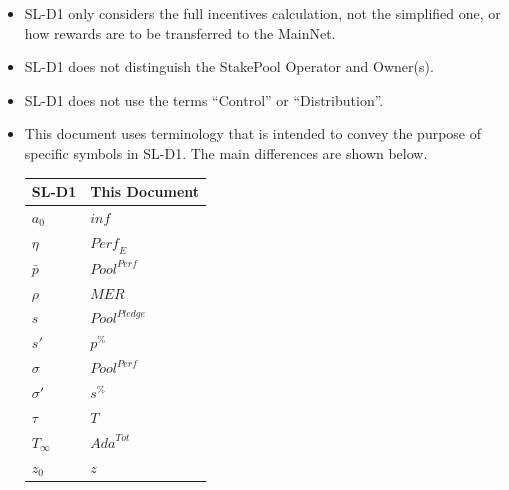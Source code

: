 \documentclass[11pt,a4paper,dvipsnames,twosided,final]{article}
\begin{document}
\begin{itemize}
\item
  SL-D1 only considers the full incentives calculation, not the simplified one, or how
  rewards are to be transferred to the MainNet.
\item
  SL-D1 does not distinguish the StakePool Operator and Owner(s).
\item
  SL-D1 does not use the terms ``Control'' or ``Distribution''.
\item
  This document uses terminology that is intended to convey the purpose of specific symbols
  in SL-D1.  The main differences are shown below.

  \begin{center}
  \begin{tabular}{||l|l||}\hline\hline
    \textbf{SL-D1} & \textbf{This Document} \\ \hline
  $a_0$ & $\textit{inf}$ \\ \hline
  $\eta$ & $\textit{Perf}_E$ \\ \hline
  $\bar{p}$  & $\textit{Pool}^{\textit{Perf}}$ \\ \hline
  $\rho$ & $\textit{MER}$ \\ \hline
  $s$  & $\textit{Pool}^{\textit{Pledge}}$ \\ \hline
  $s'$  & $\textit{p}^{\%}$ \\ \hline
  $\sigma$ & $\textit{Pool}^{\textit{Perf}}$ \\
  $\sigma'$  & $\textit{s}^{\%}$ \\ \hline
  $\tau$  & $T$ \\ \hline
  $T_{\infty}$  & $\textit{Ada}^{Tot}$ \\ \hline
  $z_0$ & $z$ \\ \hline
\hline
\end{tabular}
\end{center}
\end{itemize}
\end{document}
